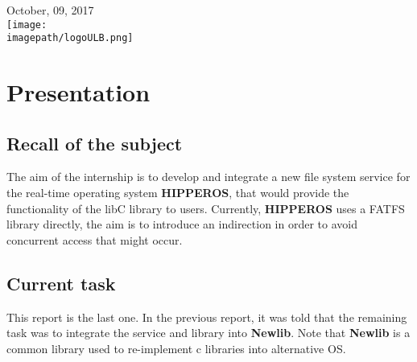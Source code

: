 \documentclass[12pt]{article}
\begin{document}
\begin{titlepage}

{\large October, 09, 2017 }\\[2cm] %



\texttt{[image: \\imagepath/logoULB.png]}\\[1cm] 
 

\vfill %

\end{titlepage}

\newpage


\pagestyle{fancy}
\fancyhf{}
\setlength\headheight{15pt}
\fancyhead[R]{}
\fancyfoot[R]{\thepage}

\newpage

\section{Presentation}
\subsection{Recall of the subject}
The aim of the internship is to develop and integrate a new file system 
service for the real-time operating system \textbf{HIPPEROS}, 
that would provide the functionality of the libC library to users.
Currently, \textbf{HIPPEROS} uses a FATFS library directly, the aim is to introduce an indirection in order to 
avoid concurrent access that might occur.

\subsection{Current task}
This report is the last one. In the previous report, it was told that the 
remaining task was to integrate the service and library into \textbf{Newlib}.
Note that \textbf{Newlib} is a common library used to re-implement c 
libraries into alternative OS.
\end{document}
